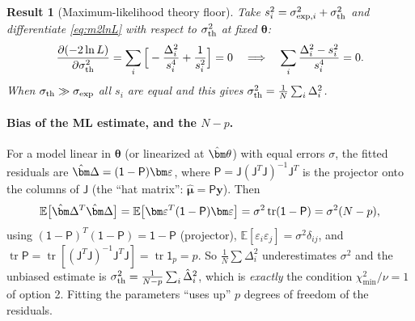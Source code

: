 \documentclass[11pt,a4paper]{article}
\numberwithin{equation}{section}
\theoremstyle{definition}
\theoremstyle{plain}
\newtheorem{result}[definition]{Result}
\theoremstyle{remark}
\numberwithin{algorithm}{section}
\newcommand{\sJ}{\mathsf J}
\newcommand{\sP}{\mathsf P}
\newcommand{\sI}{\mathsf 1}
\newcommand{\vth}{\bm\theta}
\newcommand{\vD}{\bm\Delta}
\begin{document}
\begin{result}[Maximum-likelihood theory floor]
Take $s_i^2=\sigma_{{\rm exp},i}^2+\sigma_{\rm th}^2$ and differentiate \eqref{eq:m2lnL} with respect to $\sigma_{\rm th}^2$ at fixed $\vth$:
\[
\frac{\partial(-2\ln L)}{\partial\sigma_{\rm th}^2}=\sum_i\Big[-\frac{\Delta_i^2}{s_i^4}+\frac1{s_i^2}\Big]=0
\quad\Longrightarrow\quad
\sum_i\frac{\Delta_i^2-s_i^2}{s_i^4}=0 .
\]
When $\sigma_{\rm th}\gg\sigma_{\rm exp}$ all $s_i$ are equal and this gives $\sigma_{\rm th}^2=\frac1N\sum_i\Delta_i^2$.
\end{result}
\paragraph{Bias of the ML estimate, and the $N-p$.} For a model linear in $\vth$ (or linearized at $\hat\vth$) with equal errors $\sigma$, the fitted residuals are $\hat\vD=(\sI-\sP)\bm\varepsilon$, where $\sP=\sJ(\sJ^T\sJ)^{-1}\sJ^T$ is the projector onto the columns of $\sJ$ (the ``hat matrix'': $\hat{\bm\mu}=\sP\bm y$). Then
\[
\mathbb E\big[\hat\vD^T\hat\vD\big]=\mathbb E\big[\bm\varepsilon^T(\sI-\sP)\bm\varepsilon\big]=\sigma^2\operatorname{tr}(\sI-\sP)=\sigma^2(N-p),
\]
using $(\sI-\sP)^T(\sI-\sP)=\sI-\sP$ (projector), $\mathbb E[\varepsilon_i\varepsilon_j]=\sigma^2\delta_{ij}$, and $\operatorname{tr}\sP=\operatorname{tr}[(\sJ^T\sJ)^{-1}\sJ^T\sJ]=\operatorname{tr}\sI_p=p$. So $\frac1N\sum\Delta_i^2$ underestimates $\sigma^2$ and the unbiased estimate is $\sigma_{\rm th}^2=\frac{1}{N-p}\sum_i\hat\Delta_i^2$, which is \emph{exactly} the condition $\chi^2_{\min}/\nu=1$ of option 2. Fitting the parameters ``uses up'' $p$ degrees of freedom of the residuals.
\end{document}
